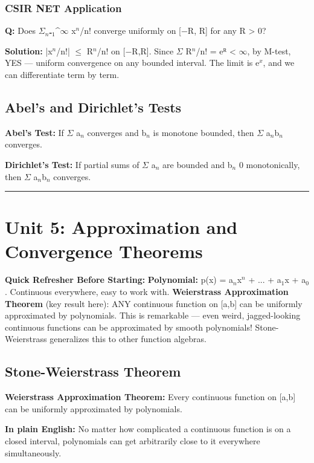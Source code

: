 \documentclass[12pt,a4paper,openany]{book}
\begin{document}
{{\subsubsection{ CSIR NET Application}
\textbf{Q:} Does $\Sigma_n$₌$_1$^$\infty$ x$^n$/n! converge uniformly on [−R, R] for any R > 0?

\textbf{Solution:} |x$^n$/n!| $\leq$ R$^n$/n! on [−R,R]. Since $\Sigma$ R$^n$/n! = eᴿ < $\infty$, by M-test, YES — uniform convergence on any bounded interval. The limit is e$^x$, and we can differentiate term by term.

\subsection{Abel's and Dirichlet's Tests}

\textbf{Abel's Test:} If $\Sigma$ a$_n$ converges and {b$_n$} is monotone bounded, then $\Sigma$ a$_n$b$_n$ converges.

\textbf{Dirichlet's Test:} If partial sums of $\Sigma$ a$_n$ are bounded and b$_n$  0 monotonically, then $\Sigma$ a$_n$b$_n$ converges.

\bigskip\noindent\rule{\textwidth}{0.4pt}\bigskip

\section{Unit 5: Approximation and Convergence Theorems}

\begin{prereqbox}
 \textbf{Quick Refresher Before Starting:}
\textbf{Polynomial:} p(x) = a$_n$x$^n$ + ... + a$_1$x + a$_0$. Continuous everywhere, easy to work with.
\textbf{Weierstrass Approximation Theorem} (key result here): ANY continuous function on [a,b] can be uniformly approximated by polynomials.
This is remarkable — even weird, jagged-looking continuous functions can be approximated by smooth polynomials!
Stone-Weierstrass generalizes this to other function algebras.
\end{prereqbox}


\subsection{Stone-Weierstrass Theorem }

\textbf{Weierstrass Approximation Theorem:} Every continuous function on [a,b] can be uniformly approximated by polynomials.

\textbf{In plain English:} No matter how complicated a continuous function is on a closed interval, polynomials can get arbitrarily close to it everywhere simultaneously.

}}
\end{document}
